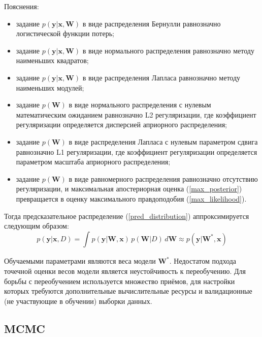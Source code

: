 \documentclass{article}
\numberwithin{equation}{section}
\begin{document}
    Пояснения:
    \begin{itemize}
        \item задание $p(\pmb{y} | \pmb{x}, \pmb{W})$ в виде распределения Бернулли
            равнозначно логистической функции потерь;
        \item задание $p(\pmb{y} | \pmb{x}, \pmb{W})$ в виде нормального распределения
            равнозначно методу наименьших квадратов;
        \item задание $p(\pmb{y} | \pmb{x}, \pmb{W})$ в виде распределения Лапласа
            равнозначно методу наименьших модулей;
        \item задание $p(\pmb{W})$ в виде нормального распределения с нулевым математическим ожиданием
            равнозначно L2 регуляризации,
            где коэффициент регуляризации определяется дисперсией априорного распределения;
        \item задание $p(\pmb{W})$ в виде распределения Лапласа с нулевым параметром сдвига
            равнозначно L1 регуляризации,
            где коэффициент регуляризации определяется параметром масштаба априорного распределения;
        \item задание $p(\pmb{W})$ в виде равномерного распределения
            равнозначно отсутствию регуляризации,
            и максимальная апостериорная оценка (\ref{max_posterior}) превращается в
            оценку максимального правдоподобия (\ref{max_likelihood}).
    \end{itemize}

    Тогда предсказательное распределение (\ref{pred_distribution})
    аппроксимируется следующим образом:
    \begin{equation}
        p(\pmb{y} | \pmb{x}, D)
        =
        \int_{}{
            p(\pmb{y} | \pmb{W}, \pmb{x})
            \,
            p(\pmb{W} | D)
            \,
            d\pmb{W}
        }
        \approx
        p(\pmb{y} | \pmb{W}^*, \pmb{x})
    \end{equation}

    Обучаемыми параметрами являются веса модели $\pmb{W}^*$.
    Недостатом подхода точечной оценки весов модели является неустойчивость к переобучению.
    Для борьбы с переобучением используется множество приёмов,
    для настройки которых требуются дополнительные вычислительные ресурсы
    и валидационные (не участвующие в обучении) выборки данных.

    \subsection{MCMC}
\end{document}
